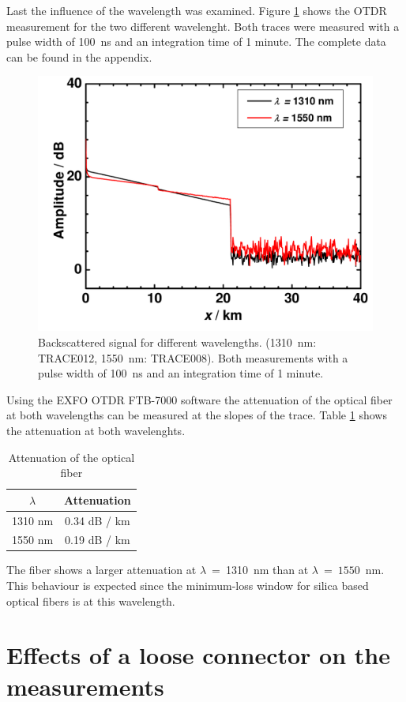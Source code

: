 Last the influence of the wavelength was examined. Figure \ref{fig:1_lambda} shows the OTDR measurement for the two different wavelenght. Both traces were measured with a pulse width of 100~ns and an integration time of 1 minute. The complete data can be found in the appendix.

\begin{figure}%
\centering
\includegraphics[width=.6\columnwidth]{grafiken/1_lambda.pdf}%
\caption{Backscattered signal for different wavelengths. (1310~nm: TRACE012, 1550~nm: TRACE008). Both measurements with a pulse width of 100~ns and an integration time of 1 minute.}%
\label{fig:1_lambda}%
\end{figure}

Using the EXFO OTDR FTB-7000 software the attenuation of the optical fiber at both wavelengths can be measured at the slopes of the trace. Table \ref{tab:1_daempfung} shows the attenuation at both wavelenghts.

\begin{table}[h]%
\centering
\caption{Attenuation of the optical fiber}
 
\begin{tabular}{cc}

\toprule

$\lambda$	& Attenuation\\
\midrule
1310 nm & 0.34 dB / km\\
1550 nm& 0.19 dB / km\\
\bottomrule 
\end{tabular}
\label{tab:1_daempfung}
\end{table}

The fiber shows a larger attenuation at $\lambda~=~$1310~nm than at $\lambda~=~1550$~nm. This behaviour is expected since the minimum-loss window for silica based optical fibers is at this wavelength. 



\section{Effects of a loose connector on the measurements}

